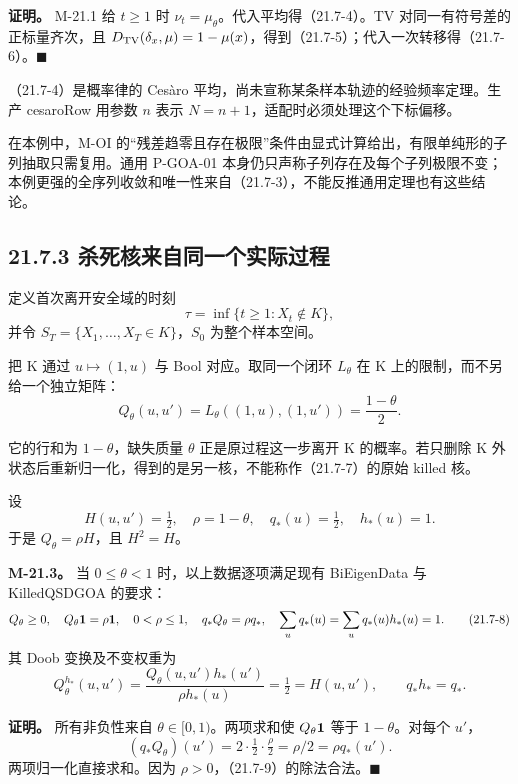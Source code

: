\documentclass[
  11pt,
  oneside]{book}
\begin{document}
\textbf{证明。} M-21.1 给 \(t\ge1\) 时 \(\nu_t=\mu_\theta\)。代入平均得（21.7-4）。TV 对同一有符号差的正标量齐次，且 \(D_{\rm TV}(\delta_x,\mu)=1-\mu(x)\)，得到（21.7-5）；代入一次转移得（21.7-6）。\(\blacksquare\)

（21.7-4）是概率律的 Cesàro 平均，尚未宣称某条样本轨迹的经验频率定理。生产 cesaroRow 用参数 \(n\) 表示 \(N=n+1\)，适配时必须处理这个下标偏移。

在本例中，M-OI 的``残差趋零且存在极限''条件由显式计算给出，有限单纯形的子列抽取只需复用。通用 P-GOA-01 本身仍只声称子列存在及每个子列极限不变；本例更强的全序列收敛和唯一性来自（21.7-3），不能反推通用定理也有这些结论。

\subsection{21.7.3 杀死核来自同一个实际过程}\label{ux6740ux6b7bux6838ux6765ux81eaux540cux4e00ux4e2aux5b9eux9645ux8fc7ux7a0b}

定义首次离开安全域的时刻 \[\tau=\inf\{t\ge1:X_t\notin K\},\] 并令 \(S_T=\{X_1,\ldots,X_T\in K\}\)，\(S_0\) 为整个样本空间。

把 K 通过 \(u\mapsto(1,u)\) 与 Bool 对应。取同一个闭环 \(L_\theta\) 在 K 上的限制，而不另给一个独立矩阵： \[Q_\theta(u,u')=L_\theta((1,u),(1,u'))=\frac{1-\theta}{2}. \tag{21.7-7}\]

它的行和为 \(1-\theta\)，缺失质量 \(\theta\) 正是原过程这一步离开 K 的概率。若只删除 K 外状态后重新归一化，得到的是另一核，不能称作（21.7-7）的原始 killed 核。

设 \[H(u,u')=\tfrac12,\quad \rho=1-\theta,\quad
q_*(u)=\tfrac12,\quad h_*(u)=1.\] 于是 \(Q_\theta=\rho H\)，且 \(H^2=H\)。

\hypertarget{m-21-3}{}\label{m-21-3}

\textbf{M-21.3。} 当 \(0\le\theta<1\) 时，以上数据逐项满足现有 BiEigenData 与 KilledQSDGOA 的要求： \[Q_\theta\ge0,\quad Q_\theta{\bf1}=\rho{\bf1},\quad
0<\rho\le1,\quad q_*Q_\theta=\rho q_*,
\quad \sum_uq_*(u)=\sum_uq_*(u)h_*(u)=1.              \tag{21.7-8}\] 其 Doob 变换及不变权重为 \[Q_\theta^{h_*}(u,u')
=\frac{Q_\theta(u,u')h_*(u')}{\rho h_*(u)}
=\tfrac12=H(u,u'),\qquad q_*h_*=q_*.                 \tag{21.7-9}\]

\textbf{证明。} 所有非负性来自 \(\theta\in[0,1)\)。两项求和使 \(Q_\theta{\bf1}\) 等于 \(1-\theta\)。对每个 \(u'\)， \[(q_*Q_\theta)(u')=2\cdot\tfrac12\cdot\tfrac{\rho}{2}
=\rho/2=\rho q_*(u').\] 两项归一化直接求和。因为 \(\rho>0\)，（21.7-9）的除法合法。\(\blacksquare\)
\end{document}
